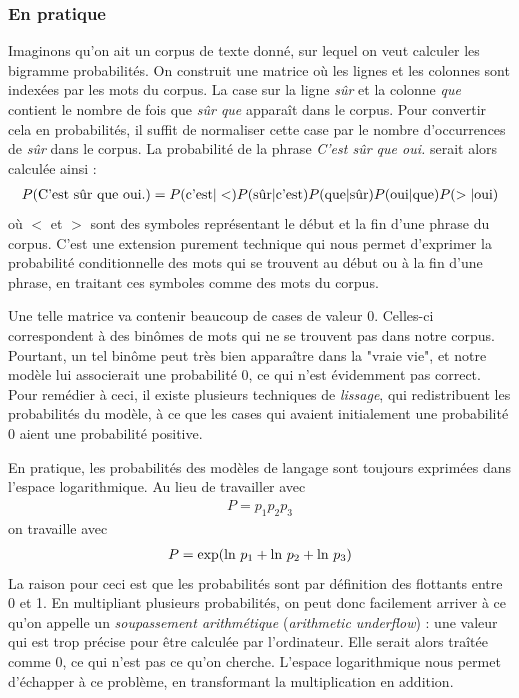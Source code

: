 \documentclass[11pt, a4paper]{report}
\begin{document}
  \subsubsection{En pratique}
  Imaginons qu'on ait un corpus de texte donné, sur lequel on veut calculer les bigramme 
  probabilités. On construit une matrice où les lignes et les colonnes sont indexées par 
  les mots du corpus. La case sur la ligne \textit{sûr} et la colonne \textit{que} contient 
  le nombre de fois que \textit{sûr que} apparaît dans le corpus. Pour convertir cela 
  en probabilités, il suffit de normaliser cette case par le nombre d'occurrences de \textit{sûr}
  dans le corpus. La probabilité de la phrase \textit{C'est sûr que oui.} serait alors 
  calculée ainsi : 
  \begin{align*}
    P(\textup{C'est sûr que oui.}) = P(\textup{c'est}|<)
    P(\textup{sûr}|\textup{c'est})P(\textup{que}|\textup{sûr})
    P(\textup{oui}|\textup{que})P(>|\textup{oui})
  \end{align*}
  où $<$ et $>$ sont des symboles représentant le début et la fin d'une phrase du corpus.
  C'est une extension purement technique qui nous permet d'exprimer la probabilité 
  conditionnelle des mots qui se trouvent au début ou à la fin d'une phrase, en traitant 
  ces symboles comme des mots du corpus. 

  Une telle matrice va contenir beaucoup de cases de valeur 0. Celles-ci correspondent à 
  des binômes de mots qui ne se trouvent pas dans notre corpus. Pourtant, un tel binôme 
  peut très bien apparaître dans la "vraie vie", et notre modèle lui associerait une 
  probabilité 0, ce qui n'est évidemment pas correct. Pour remédier à ceci, il existe 
  plusieurs techniques de \textit{lissage}, qui redistribuent les probabilités du modèle, 
  à ce que les cases qui avaient initialement une probabilité 0 aient une probabilité
  positive. 

  En pratique, les probabilités des modèles de langage sont toujours exprimées dans 
  l'espace logarithmique. Au lieu de travailler avec  
  \begin{align}
    P = p_1 p_2 p_3
  \end{align}
  on travaille avec 
  \begin{align}
    P = \textup{exp}(\textup{ln} \ p_1 + \textup{ln} \ p_2 + \textup{ln} \ p_3)
  \end{align}
  La raison pour ceci est que les probabilités sont par définition des flottants entre 
  0 et 1. En multipliant plusieurs probabilités, on peut donc facilement arriver à ce qu'on 
  appelle un \textit{soupassement arithmétique} (\textit{arithmetic underflow}) : une 
  valeur qui est trop précise pour être calculée par l'ordinateur. Elle serait alors 
  traîtée comme 0, ce qui n'est pas ce qu'on cherche. L'espace logarithmique nous permet 
  d'échapper à ce problème, en transformant la multiplication en addition. 
\end{document}
